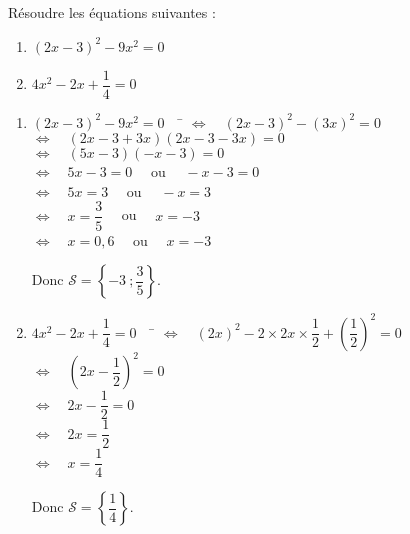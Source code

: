 \documentclass[a4paper,11pt,exos]{nsi} %
\begin{document}
\maketitle

\begin{exercice}
    Résoudre les équations suivantes :
    \begin{multicols}{2}
        \begin{enumerate}
            \item $(2x-3)^2-9x^2=0$
	        \item $4x^2-2x+\dfrac{1}{4}=0$
        \end{enumerate}
    \end{multicols}
    
\end{exercice}

\begin{enumerate}
    \item \begin{tabbing}
        $(2x-3)^2-9x^2=0 \quad$    \=  $\iff\quad (2x-3)^2-(3x)^2=0$\\
        \>  $\iff\quad  (2x-3+3x)(2x-3-3x)=0$\\
        \>  $\iff\quad  (5x-3)(-x-3)=0$\\
        \>  $\iff\quad  5x-3=0 \quad$ ou $\quad -x-3=0$\\
        \>  $\iff\quad  5x=3\quad$ ou $\quad -x = 3$\\
        \>  $\iff\quad  x=\dfrac{3}{5}\quad$ ou $\quad x=-3$\\
        \>  $\iff\quad  x=0,6\quad$ ou $\quad x=-3$
    \end{tabbing}
    Donc $\mathcal{S}=\left\{-3\ ;\dfrac{3}{5} \right\}$.

    \item \begin{tabbing}
        $4x^2-2x+\dfrac{1}{4}=0 \quad$    \=  $\iff\quad \left(2x\right)^2-2\times 2x\times \dfrac{1}{2} +\left(\dfrac{1}{2}\right)^2=0$\\[.5em]
        \>  $\iff\quad  \left(2x-\dfrac{1}{2}\right)^2=0$\\[.5em]
        \>  $\iff\quad  2x-\dfrac{1}{2}=0$\\[.5em]
        \>  $\iff\quad  2x=\dfrac{1}{2}$\\[.5em]
        \>  $\iff\quad  x=\dfrac{1}{4}$
    \end{tabbing}
    Donc $\mathcal{S}=\left\{\dfrac{1}{4} \right\}$.
\end{enumerate}
\end{document}
